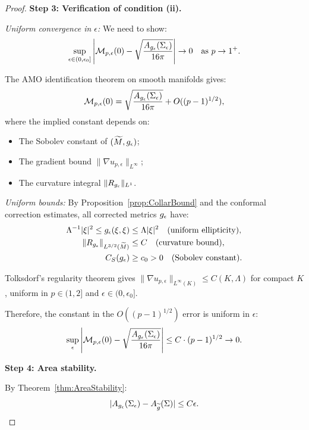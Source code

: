 \begin{proof}
\textbf{Step 3: Verification of condition (ii).}

\textit{Uniform convergence in $\epsilon$:} We need to show:
\begin{equation}\label{eq:UniformPLimit}
    \sup_{\epsilon \in (0, \epsilon_0]} \left| \mathcal{M}_{p,\epsilon}(0) - \sqrt{\frac{A_{g_{\epsilon}}(\Sigma_\epsilon)}{16\pi}} \right| \to 0 \quad \text{as } p \to 1^+.
\end{equation}

The AMO identification theorem on smooth manifolds gives:
\begin{equation}
    \mathcal{M}_{p,\epsilon}(0) = \sqrt{\frac{A_{g_{\epsilon}}(\Sigma_\epsilon)}{16\pi}} + O((p-1)^{1/2}),
\end{equation}
where the implied constant depends on:
\begin{itemize}
    \item The Sobolev constant of $(\widetilde{M}, g_{\epsilon})$;
    \item The gradient bound $\|\nabla u_{p,\epsilon}\|_{L^\infty}$;
    \item The curvature integral $\|R_{g_{\epsilon}}\|_{L^1}$.
\end{itemize}

\textit{Uniform bounds:} By Proposition~\ref{prop:CollarBound} and the conformal correction estimates, all corrected metrics $g_{\epsilon}$ have:
\begin{align}
    \Lambda^{-1} |\xi|^2 \le g_{\epsilon}(\xi, \xi) &\le \Lambda |\xi|^2 \quad \text{(uniform ellipticity)}, \\
    \|R_{g_{\epsilon}}\|_{L^{3/2}(\widetilde{M})} &\le C \quad \text{(curvature bound)}, \\
    C_S(g_{\epsilon}) &\ge c_0 > 0 \quad \text{(Sobolev constant)}.
\end{align}

Tolksdorf's regularity theorem gives $\|\nabla u_{p,\epsilon}\|_{L^\infty(K)} \le C(K, \Lambda)$ for compact $K$, uniform in $p \in (1, 2]$ and $\epsilon \in (0, \epsilon_0]$.

Therefore, the constant in the $O((p-1)^{1/2})$ error is uniform in $\epsilon$:
\begin{equation}
    \sup_{\epsilon} \left| \mathcal{M}_{p,\epsilon}(0) - \sqrt{\frac{A_{g_{\epsilon}}(\Sigma_\epsilon)}{16\pi}} \right| \le C \cdot (p-1)^{1/2} \to 0.
\end{equation}

\textbf{Step 4: Area stability.}

By Theorem~\ref{thm:AreaStability}:
\begin{equation}
    |A_{g_{\epsilon}}(\Sigma_\epsilon) - A_{\widetilde{g}}(\Sigma)| \le C \epsilon.
\end{equation}


\end{proof}
